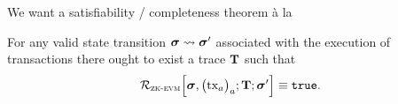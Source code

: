 We want a satisfiability / completeness theorem à la
\begin{thm}[Completeness]
	For any valid state transition $\bm{\sigma} \rightsquigarrow \bm{\sigma}'$ associated with the execution of transactions there ought to exist a trace $\textbf{T}$ such that
	\[
		\mathcal{R}_{\textsc{zk-evm}}
		\Big[ \bm{\sigma}, \big(\text{tx}_a\big)_{a};
		\textbf{T};
		\bm{\sigma}' \Big]
		\equiv \mathtt{true}.
	\]
\end{thm}
